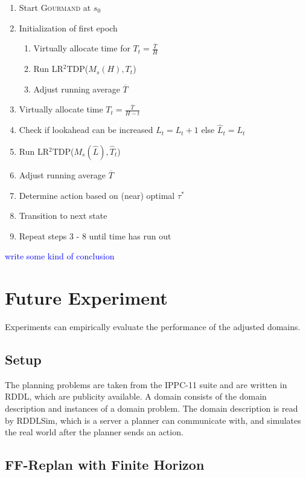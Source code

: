 \documentclass[runningheads,a4paper]{llncs}
\newcommand\todo[1]{\textcolor{blue}{#1}}
\begin{document}
\begin{enumerate}
	\item Start \textsc{Gourmand} at $s_0$
	\item Initialization of first epoch
	\begin{enumerate}
		\item Virtually allocate time for  $T_t = \frac{\overline{T}}{H}$
		\item Run LR$^2$TDP($M_s(H), T_t$)
		\item Adjust running average $\overline{T}$
	\end{enumerate}
	\item Virtually allocate time  $T_t = \frac{\overline{T}}{H - t}$
	\item Check if lookahead can be increased $\widehat{L}_t = L_t + 1$ else $\widehat{L}_t = L_t $
	\item Run LR$^2$TDP($M_s(\widehat{L}), \widehat{T}_t$)
	\item Adjust running average $\overline{T}$
	\item Determine action based on (near) optimal $\tau^*$
	\item Transition to next state
	\item Repeat steps 3 - 8 until time has run out
\end{enumerate}

\todo{write some kind of conclusion}


\section{Future Experiment}
\label{sec:experiment}

Experiments can empirically evaluate the performance of the adjusted domains.

\subsection{Setup}

The planning problems are taken from the IPPC-11 suite and are written in RDDL,
which are publicity available. A domain consists of the domain description and
instances of a domain problem. The domain description is read by RDDLSim, which
is a server a planner can communicate with, and simulates the real world after
the planner sends an action.

\subsection{FF-Replan with Finite Horizon}
\end{document}
